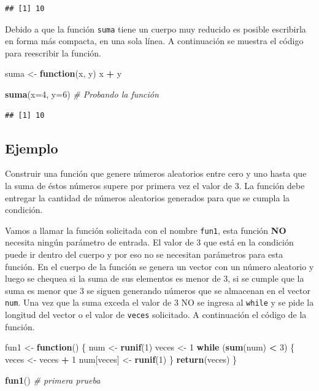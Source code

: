 \documentclass[10pt,]{krantz}
\makeatletter
\newenvironment{Shaded}{\begin{snugshade}}{\end{snugshade}}
\newcommand{\KeywordTok}[1]{\textcolor[rgb]{0.13,0.29,0.53}{\textbf{#1}}}
\newcommand{\DataTypeTok}[1]{\textcolor[rgb]{0.13,0.29,0.53}{#1}}
\newcommand{\DecValTok}[1]{\textcolor[rgb]{0.00,0.00,0.81}{#1}}
\newcommand{\StringTok}[1]{\textcolor[rgb]{0.31,0.60,0.02}{#1}}
\newcommand{\CommentTok}[1]{\textcolor[rgb]{0.56,0.35,0.01}{\textit{#1}}}
\newcommand{\ControlFlowTok}[1]{\textcolor[rgb]{0.13,0.29,0.53}{\textbf{#1}}}
\newcommand{\OperatorTok}[1]{\textcolor[rgb]{0.81,0.36,0.00}{\textbf{#1}}}
\newcommand{\NormalTok}[1]{#1}
\newenvironment{kframe}{%
\medskip{}
\setlength{\fboxsep}{.8em}
 \def\at@end@of@kframe{}%
 \ifinner\ifhmode%
  \def\at@end@of@kframe{\end{minipage}}%
  \begin{minipage}{\columnwidth}%
 \fi\fi%
 \def\FrameCommand##1{\hskip\@totalleftmargin \hskip-\fboxsep
 \colorbox{shadecolor}{##1}\hskip-\fboxsep
     \hskip-\linewidth \hskip-\@totalleftmargin \hskip\columnwidth}%
 \MakeFramed {\advance\hsize-\width
   \@totalleftmargin\z@ \linewidth\hsize
   \@setminipage}}%
 {\par\unskip\endMakeFramed%
 \at@end@of@kframe}
\renewenvironment{Shaded}{\begin{kframe}}{\end{kframe}}
\makeatother
\begin{document}
\begin{verbatim}
## [1] 10
\end{verbatim}

Debido a que la función \texttt{suma} tiene un cuerpo muy reducido es
posible escribirla en forma más compacta, en una sola línea. A
continuación se muestra el código para reescribir la función.

\begin{Shaded}
\begin{Highlighting}[]
\NormalTok{suma <-}\StringTok{ }\ControlFlowTok{function}\NormalTok{(x, y) x }\OperatorTok{+}\StringTok{ }\NormalTok{y}

\KeywordTok{suma}\NormalTok{(}\DataTypeTok{x=}\DecValTok{4}\NormalTok{, }\DataTypeTok{y=}\DecValTok{6}\NormalTok{)  }\CommentTok{# Probando la función}
\end{Highlighting}
\end{Shaded}

\begin{verbatim}
## [1] 10
\end{verbatim}

\subsection*{Ejemplo}\label{ejemplo-21}


Construir una función que genere números aleatorios entre cero y uno
hasta que la suma de éstos números supere por primera vez el valor de 3.
La función debe entregar la cantidad de números aleatorios generados
para que se cumpla la condición.

Vamos a llamar la función solicitada con el nombre \texttt{fun1}, esta
función \textbf{NO} necesita ningún parámetro de entrada. El valor de 3
que está en la condición puede ir dentro del cuerpo y por eso no se
necesitan parámetros para esta función. En el cuerpo de la función se
genera un vector con un número aleatorio y luego se chequea si la suma
de sus elementos es menor de 3, si se cumple que la suma es menor que 3
se siguen generando números que se almacenan en el vector \texttt{num}.
Una vez que la suma exceda el valor de 3 NO se ingresa al \texttt{while}
y se pide la longitud del vector o el valor de \texttt{veces}
solicitado. A continuación el código de la función.

\begin{Shaded}
\begin{Highlighting}[]
\NormalTok{fun1 <-}\StringTok{ }\ControlFlowTok{function}\NormalTok{() \{}
\NormalTok{  num <-}\StringTok{ }\KeywordTok{runif}\NormalTok{(}\DecValTok{1}\NormalTok{)}
\NormalTok{  veces <-}\StringTok{ }\DecValTok{1}
  \ControlFlowTok{while}\NormalTok{ (}\KeywordTok{sum}\NormalTok{(num) }\OperatorTok{<}\StringTok{ }\DecValTok{3}\NormalTok{) \{}
\NormalTok{    veces <-}\StringTok{ }\NormalTok{veces }\OperatorTok{+}\StringTok{ }\DecValTok{1}
\NormalTok{    num[veces] <-}\StringTok{ }\KeywordTok{runif}\NormalTok{(}\DecValTok{1}\NormalTok{)}
\NormalTok{  \}}
  \KeywordTok{return}\NormalTok{(veces)}
\NormalTok{\}}

\KeywordTok{fun1}\NormalTok{()  }\CommentTok{# primera prueba}
\end{Highlighting}
\end{Shaded}
\end{document}
